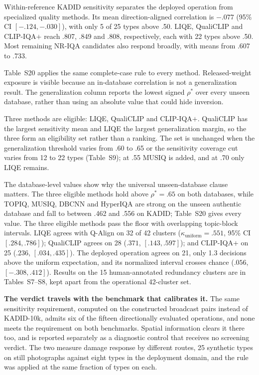 Within-reference KADID sensitivity separates the deployed operation from
specialized quality methods. Its mean direction-aligned correlation is $-.077$
(95\% CI $[-.124,-.030]$), with only 5 of 25 types above .50. LIQE,
QualiCLIP and CLIP-IQA$+$ reach .807, .849 and .808, respectively, each with 22
types above .50. Most remaining NR-IQA candidates also respond broadly, with
means from .607 to .733.

Table~S20 applies the same complete-case rule to every method.
Released-weight exposure is visible because an in-database correlation is not a
generalization result. The generalization column reports the lowest signed
$\rho^{*}$ over every unseen database, rather than using an absolute value that
could hide inversion.

Three methods are eligible: LIQE, QualiCLIP and CLIP-IQA$+$. QualiCLIP has the largest
sensitivity mean and LIQE the largest generalization margin, so the three form an
eligibility set rather than a ranking. The set is unchanged when the generalization
threshold varies from .60 to .65 or the sensitivity coverage cut varies from 12 to 22
types (Table~S9); at .55 MUSIQ is added, and at .70 only LIQE remains.

The database-level values show why the universal unseen-database clause matters.
The three eligible methods hold above $\rho^{*}=.65$ on both databases, while TOPIQ,
MUSIQ, DBCNN and HyperIQA are strong on the unseen authentic database and fall to between
.462 and .556 on KADID; Table~S20 gives every value. The three eligible methods pass the floor with overlapping topic-block intervals. LIQE agrees with Q-Align
on 32 of 42 clusters ($\kappa_{\mathrm{uniform}}=.551$, 95\% CI
$[.284,.786]$); QualiCLIP agrees on 28 ($.371$, $[.143,.597]$); and
CLIP-IQA$+$ on 25 ($.236$, $[.034,.435]$). The deployed operation agrees on 21,
only 1.3 decisions above the uniform expectation, and its normalized interval
crosses chance ($.056$, $[-.308,.412]$). Results on the 15 human-annotated redundancy clusters
are in Tables~S7--S8, kept apart from the operational 42-cluster set.

\textbf{The verdict travels with the benchmark that calibrates it.} The same
sensitivity requirement, computed on the constructed broadcast pairs instead of KADID-10k,
admits six of the fifteen directionally evaluated operations, and none meets the
requirement on both benchmarks. Spatial information clears it there too, and is reported
separately as a diagnostic control that receives no screening verdict. The two measure damage response by different routes, 25
synthetic types on still photographs against eight types in the deployment domain, and the
rule was applied at the same fraction of types on each.

